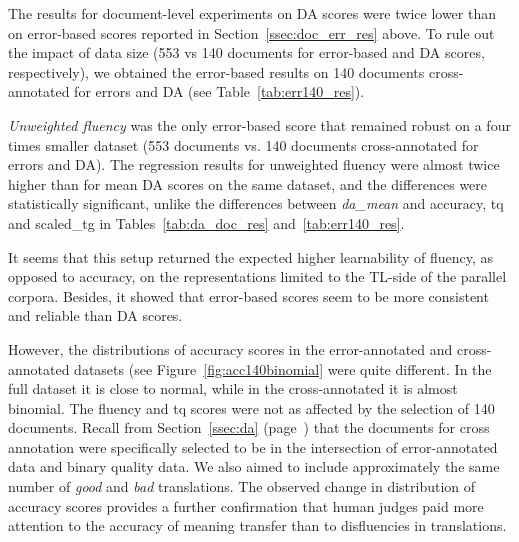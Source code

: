 The results for document-level experiments on DA scores were twice lower than on error-based scores reported in Section~\ref{ssec:doc_err_res} above. To rule out the impact of data size (553 vs 140 documents for error-based and DA scores, respectively), we obtained the error-based results on 140 documents cross-annotated for errors and DA (see Table~\ref{tab:err140_res}).

\textit{Unweighted fluency} was the only error-based score that remained robust on a four times smaller dataset (553 documents vs. 140 documents cross-annotated for errors and DA). The regression results for unweighted fluency were almost twice higher than for mean DA scores on the same dataset, and the differences were statistically significant, unlike the differences between \textit{da\_mean} and accuracy, tq and scaled\_tg in Tables~\ref{tab:da_doc_res} and~\ref{tab:err140_res}.

It seems that this setup returned the expected higher learnability of fluency, as opposed to accuracy, on the representations limited to the TL-side of the parallel corpora. Besides, it showed that error-based scores seem to be more consistent and reliable than DA scores. %
 
However, the distributions of accuracy scores in the error-annotated and cross-annotated datasets (see Figure~\ref{fig:acc140binomial} were quite different. In the full dataset it is close to normal, while in the cross-annotated it is almost binomial. The fluency and tq scores were not as affected by the selection of 140 documents. Recall from Section~\ref{ssec:da} (page~\pageref{pg:intersection140}) that the documents for cross annotation were specifically selected to be in the intersection of error-annotated data and binary quality data. We also aimed to include approximately the same number of \textit{good} and \textit{bad} translations. The observed change in distribution of accuracy scores provides a further confirmation that human judges paid more attention to the accuracy of meaning transfer than to disfluencies in translations. 

